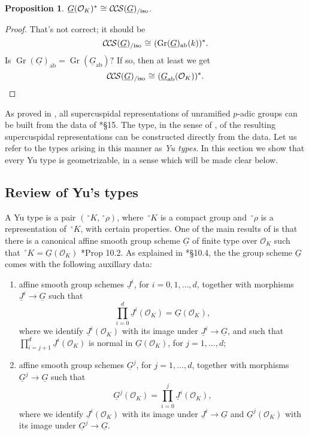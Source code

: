 \documentclass[10pt]{amsart}
\theoremstyle{plain}
\newtheorem{proposition}[theorem]{Proposition}
\theoremstyle{definition}
\newcommand{\OK}{\mathcal{O}_K}
\newcommand{\Fq}{k}
\DeclareMathOperator{\Gr}{Gr}
\newcommand{\ab}{_{\operatorname{ab}}}
\newcommand{\iso}{{\ \cong\ }}
\newcommand{\CCS}{{\mathcal{C\hskip-.8pt C\hskip-0.8pt S}}}
\newcommand{\CCSiso}[1]{\CCS(#1)_{/\text{iso}}}
\begin{document}
\begin{proposition}\label{prop:QCS}
$\underline{G}(\OK)^* \iso \CCSiso{\underline{G}}$.
\end{proposition}

\begin{proof}
That's not correct; it should be 
\[
\CCSiso{\underline{G}} \iso (\Gr(\underline{G})\ab(\Fq))^*.
\]
Is $\Gr(\underline{G})\ab = \Gr(\underline{G}\ab)?$ If so, then at least we get 
\[
\CCSiso{\underline{G}} \iso (\underline{G}\ab(\OK))^*.
\]
\end{proof}

\fi


\newcommand{\red}{^{\operatorname{red}}}


As proved in \cite{kim:07a}, all supercuspidal representations of unramified $p$-adic groups can be built from the data of \cite{yu:01a}*{\S 15}.
The type, in the sense of \cite{bushnell-kutzko:98a}, of the resulting supercuspidal representations can be constructed directly from the data. 
Let us refer to the types arising in this manner as {\it Yu types}.
In this section we show that every Yu type is geometrizable, in a sense which will be made clear below.


\subsection{Review of Yu's types}

A Yu type is a pair $(\,^\circ K,\,^\circ \rho)$, where $\,^\circ K$ is a compact group and $\,^\circ \rho$ is a representation of $\,^\circ K$, with certain properties. 
One of the main results of \cite{yu:models} is that there is a canonical affine smooth group scheme $\underline{G}$ of finite type over $\OK$ such that $\,^\circ K = \underline{G}(\OK)$ \cite{yu:models}*{Prop 10.2}.
As explained in \cite{yu:models}*{\S 10.4}, the
the group scheme $\underline{G}$ comes with the following auxillary data:
\begin{enumerate}
\item
	affine smooth group schemes $\underline{J}^i$, for $i=0, 1, \ldots, d$, together with morphisms $\underline{J}^i \to \underline{G}$ such that \[\prod_{i=0}^d \underline{J}^i(\OK) = \underline{G}(\OK),\] where we identify $\underline{J}^i(\OK)$ with its image under $\underline{J}^i \to \underline{G}$, and such that $\prod_{i=j+1}^{d} \underline{J}^i(\OK)$ is normal in $\underline{G}(\OK)$, for $j=1, \ldots, d$;
\item affine smooth group schemes $\underline{G}^{j}$, for $j=1, \ldots, d$, together with morphisms $\underline{G}^{j}\to \underline{G}$ such that 
\[
\underline{G}^{j}(\OK) = \prod_{i=0}^{j} \underline{J}^i(\OK),
\] 
where we identify $\underline{J}^i(\OK)$ with its image under $\underline{J}^i \to \underline{G}$ and $\underline{G}^{j}(\OK)$ with its image under $\underline{G}^j \to \underline{G}$.
\end{enumerate}
\end{document}
